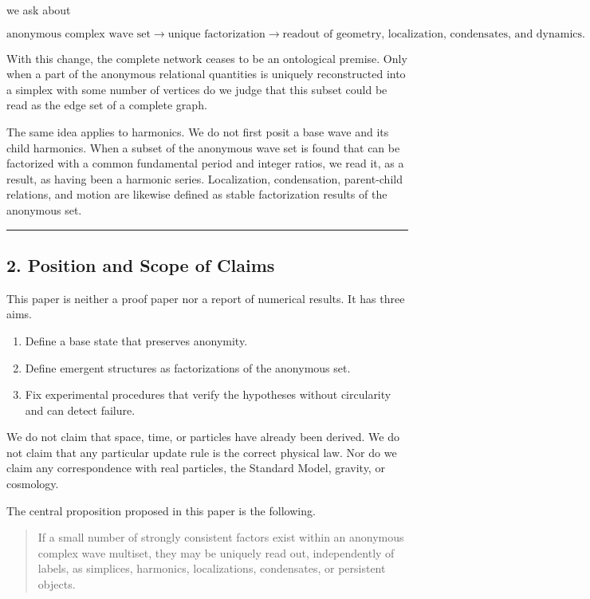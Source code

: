 \documentclass[
  a4paper,
]{article}
\providecommand{\tightlist}{%
  \setlength{\itemsep}{0pt}\setlength{\parskip}{0pt}}
\begin{document}
we ask about

\[
\text{anonymous complex wave set}
\longrightarrow
\text{unique factorization}
\longrightarrow
\text{readout of geometry, localization, condensates, and dynamics}.
\]

With this change, the complete network ceases to be an ontological
premise. Only when a part of the anonymous relational quantities is
uniquely reconstructed into a simplex with some number of vertices do we
judge that this subset could be read as the edge set of a complete
graph.

The same idea applies to harmonics. We do not first posit a base wave
and its child harmonics. When a subset of the anonymous wave set is
found that can be factorized with a common fundamental period and
integer ratios, we read it, as a result, as having been a harmonic
series. Localization, condensation, parent-child relations, and motion
are likewise defined as stable factorization results of the anonymous
set.

\begin{center}\rule{0.5\linewidth}{0.5pt}\end{center}

\subsection{2. Position and Scope of
Claims}\label{position-and-scope-of-claims}

This paper is neither a proof paper nor a report of numerical results.
It has three aims.

\begin{enumerate}
\def\labelenumi{\arabic{enumi}.}
\tightlist
\item
  Define a base state that preserves anonymity.
\item
  Define emergent structures as factorizations of the anonymous set.
\item
  Fix experimental procedures that verify the hypotheses without
  circularity and can detect failure.
\end{enumerate}

We do not claim that space, time, or particles have already been
derived. We do not claim that any particular update rule is the correct
physical law. Nor do we claim any correspondence with real particles,
the Standard Model, gravity, or cosmology.

The central proposition proposed in this paper is the following.

\begin{quote}
If a small number of strongly consistent factors exist within an
anonymous complex wave multiset, they may be uniquely read out,
independently of labels, as simplices, harmonics, localizations,
condensates, or persistent objects.
\end{quote}
\end{document}
